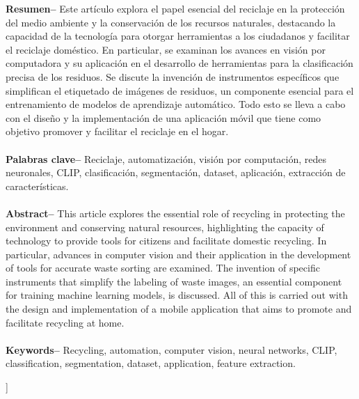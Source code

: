 \documentclass[10pt,a4paper,twocolumn,twoside]{article}
\begin{document}
\begin{@twocolumnfalse}
\thispagestyle{primerapagina}
\begin{center}
\parbox{0.915\textwidth}
{\sffamily
\textbf{Resumen--}
Este artículo explora el papel esencial del reciclaje en la protección del medio ambiente y la conservación de los recursos naturales, destacando la capacidad de la tecnología para otorgar herramientas a los ciudadanos y facilitar el reciclaje doméstico. En particular, se examinan los avances en visión por computadora y su aplicación en el desarrollo de herramientas para la clasificación precisa de los residuos. Se discute la invención de instrumentos específicos que simplifican el etiquetado de imágenes de residuos, un componente esencial para el entrenamiento de modelos de aprendizaje automático. Todo esto se lleva a cabo con el diseño y la implementación de una aplicación móvil que tiene como objetivo promover y facilitar el reciclaje en el hogar.\\
\\
\textbf{Palabras clave--} Reciclaje, automatización, visión por computación, redes neuronales, CLIP, clasificación, segmentación, dataset, aplicación, extracción de características.
\\
\bigskip
\\
\textbf{Abstract--}
This article explores the essential role of recycling in protecting the environment and conserving natural resources, highlighting the capacity of technology to provide tools for citizens and facilitate domestic recycling. In particular, advances in computer vision and their application in the development of tools for accurate waste sorting are examined. The invention of specific instruments that simplify the labeling of waste images, an essential component for training machine learning models, is discussed. All of this is carried out with the design and implementation of a mobile application that aims to promote and facilitate recycling at home.\\
\\
\textbf{Keywords--} Recycling, automation, computer vision, neural networks, CLIP, classification, segmentation, dataset, application, feature extraction.
}

\bigskip

{\vrule depth 0pt height 0.5pt width 4cm\hspace{7.5pt}%
%
\hspace{7.5pt}\vrule depth 0pt height 0.5pt width 4cm\relax}

\end{center}

\bigskip
\end{@twocolumnfalse}]
\end{document}
